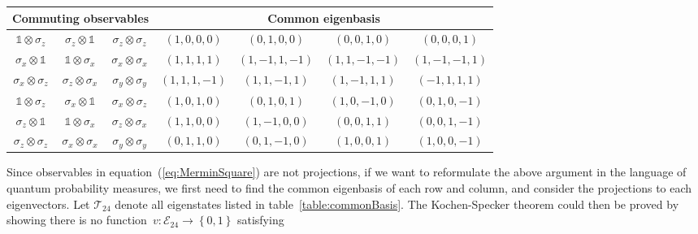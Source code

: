 \documentclass[reprint, aps, prl,superscriptaddress, showpacs,
showkeys]{revtex4-1}
\theoremstyle{plain}
\theoremstyle{definition}
\newcommand{\events}{\ensuremath{\mathcal{E}}}
\newcommand{\ket}[1]{{\left\vert{#1}\right\rangle}}
\begin{document}
\begin{table*}
\caption{\label{table:commonBasis}In each row, three observables are listed
in the left column commutes, and their common eigenbasis is listed
in the right column. In order to unified and simplify notation, we
do not normalize eigenstates, and represent the state~$\alpha_{0}\ket{0}+\alpha_{1}\ket{1}+\alpha_{2}\ket{2}+\alpha_{3}\ket{3}$
as $\left(\alpha_{0},\alpha_{1},\alpha_{2},\alpha_{3}\right)$.}
\begin{ruledtabular}
\begin{tabular}{ccc|cccc} 
\multicolumn{3}{c}{Commuting observables} & \multicolumn{4}{c}{Common eigenbasis} \\
\hline
$\mathbb{1}\otimes\sigma_{z}$ & $\sigma_{z}\otimes\mathbb{1}$ & $\sigma_{z}\otimes\sigma_{z}$ & $(1, 0, 0, 0)$ & $(0, 1, 0, 0)$ & $(0, 0, 1, 0)$ & $(0, 0, 0, 1)$ \\
$\sigma_{x}\otimes\mathbb{1}$ & $\mathbb{1}\otimes\sigma_{x}$ & $\sigma_{x}\otimes\sigma_{x}$ & $(1, 1, 1, 1)$ & $(1, -1, 1, -1)$ & $(1, 1, -1, -1)$ & $(1, -1, -1, 1)$ \\
$\sigma_{x}\otimes\sigma_{z}$ & $\sigma_{z}\otimes\sigma_{x}$ & $\sigma_{y}\otimes\sigma_{y}$ & $(1, 1, 1, -1)$ & $(1, 1, -1, 1)$ & $(1, -1, 1, 1)$ & $(-1, 1, 1, 1)$ \\
$\mathbb{1}\otimes\sigma_{z}$ & $\sigma_{x}\otimes\mathbb{1}$ & $\sigma_{x}\otimes\sigma_{z}$ & $(1, 0, 1, 0)$ & $(0, 1, 0, 1)$ & $(1, 0, -1, 0)$ & $(0, 1, 0, -1)$ \\
$\sigma_{z}\otimes\mathbb{1}$ & $\mathbb{1}\otimes\sigma_{x}$ & $\sigma_{z}\otimes\sigma_{x}$ & $(1, 1, 0, 0)$ & $(1, -1, 0, 0)$ & $(0, 0, 1, 1)$ & $(0, 0, 1, -1)$ \\
$\sigma_{z}\otimes\sigma_{z}$ & $\sigma_{x}\otimes\sigma_{x}$ & $\sigma_{y}\otimes\sigma_{y}$ & $(0, 1, 1, 0)$ & $(0, 1, -1, 0)$ & $(1, 0, 0, 1)$ & $(1, 0, 0, -1)$ \\
\end{tabular} 
\end{ruledtabular}
\end{table*}
Since observables in equation~(\ref{eq:MerminSquare}) are not projections,
if we want to reformulate the above argument in the language of quantum
probability measures, we first need to find the common eigenbasis
of each row and column, and consider the projections to each eigenvectors.
Let $\mathcal{T}_{24}$ denote all eigenstates listed in table~\ref{table:commonBasis}.
The Kochen-Specker theorem could then be proved by showing there is
no function~$v:\events_{24}\rightarrow\left\{ 0,1\right\} $ satisfying
\end{document}
